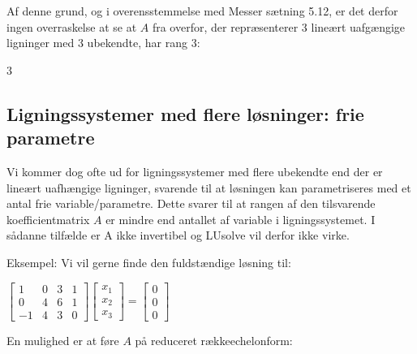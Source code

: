\documentclass[letterpaper,10pt,english]{jupyterBook}
\begin{document}
Af denne grund, og i overensstemmelse med Messer sætning 5.12, er det derfor ingen overraskelse at se at \(A\) fra overfor, der repræsenterer 3 lineært uafgængige ligninger med 3 ubekendte, har rang 3:

\begin{sphinxVerbatim}[commandchars=\\\{\}]
\end{sphinxVerbatim}

\begin{sphinxVerbatim}[commandchars=\\\{\}]
3
\end{sphinxVerbatim}


\subsection{Ligningssystemer med flere løsninger: frie parametre}
\label{\detokenize{notebooks/sympy/Notebook_LinAlg1_5:ligningssystemer-med-flere-losninger-frie-parametre}}
Vi kommer dog ofte ud for ligningssystemer med flere ubekendte end der er lineært uafhængige ligninger, svarende til at løsningen kan parametriseres med et antal frie variable/parametre. Dette svarer til at rangen af den tilsvarende koefficientmatrix \(A\) er mindre end antallet af variable i ligningssystemet.
I sådanne tilfælde er A ikke invertibel og LU\sphinxhyphen{}solve vil derfor ikke virke.

Eksempel: Vi vil gerne finde den fuldstændige løsning til:

\(\displaystyle \left[\begin{matrix}1 & 0 & 3 & 1\\0 & 4 & 6 & 1\\-1 & 4 & 3 & 0\end{matrix}\right] \displaystyle \left[\begin{matrix}x_{1}\\x_{2}\\x_{3}\end{matrix}\right] = \displaystyle \left[\begin{matrix}0\\0\\0\end{matrix}\right]\)

En mulighed er at føre \(A\) på reduceret række\sphinxhyphen{}echelonform:
\end{document}
